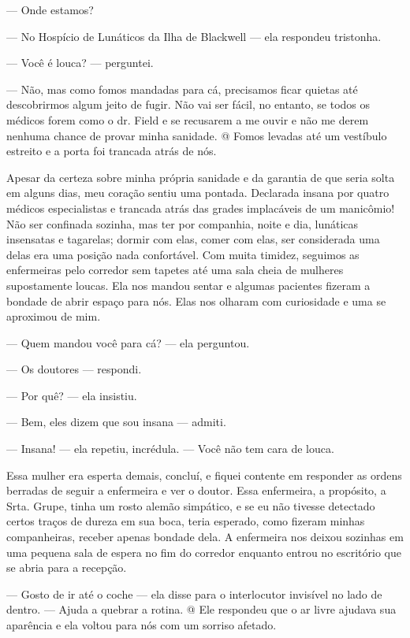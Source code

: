 --- Onde estamos?

--- No Hospício de Lunáticos da Ilha de Blackwell --- ela respondeu
tristonha.

--- Você é louca? --- perguntei.

--- Não, mas como fomos mandadas para cá, precisamos ficar quietas até
descobrirmos algum jeito de fugir. Não vai ser fácil, no entanto, se
todos os médicos forem como o dr. Field e se recusarem a me ouvir e não
me derem nenhuma chance de provar minha sanidade. @ Fomos levadas até um
vestíbulo estreito e a porta foi trancada atrás de nós.

Apesar
da certeza sobre minha própria sanidade e da garantia de que seria solta
em alguns dias, meu coração sentiu uma pontada. Declarada insana por
quatro médicos especialistas e trancada atrás das grades implacáveis de
um manicômio! Não ser confinada sozinha, mas ter por companhia, noite e
dia, lunáticas insensatas e tagarelas; dormir com elas, comer com elas,
ser considerada uma delas era uma posição nada confortável. Com muita
timidez, seguimos as enfermeiras pelo corredor sem tapetes até uma sala
cheia de mulheres supostamente loucas. Ela nos mandou sentar e algumas
pacientes fizeram a bondade de abrir espaço para nós. Elas nos olharam
com curiosidade e uma se aproximou de mim.

--- Quem mandou você para cá? --- ela perguntou.

--- Os doutores --- respondi.

--- Por quê? --- ela insistiu.

--- Bem, eles dizem que sou insana --- admiti.

--- Insana! --- ela repetiu, incrédula. --- Você não tem cara de louca.

Essa mulher era esperta demais, concluí, e fiquei contente em responder
as ordens berradas de seguir a enfermeira e ver o doutor. Essa
enfermeira, a propósito, a Srta. Grupe, tinha um rosto alemão simpático,
e se eu não tivesse detectado certos traços de dureza em sua boca, teria
esperado, como fizeram minhas companheiras, receber apenas bondade dela.
A enfermeira nos deixou sozinhas em uma pequena sala de espera no fim do
corredor enquanto entrou no escritório que se abria para a recepção.

--- Gosto de ir até o coche --- ela disse para o interlocutor invisível
no lado de dentro. --- Ajuda a quebrar a rotina. @ Ele respondeu que o
ar livre ajudava sua aparência e ela voltou para nós com um sorriso
afetado.

